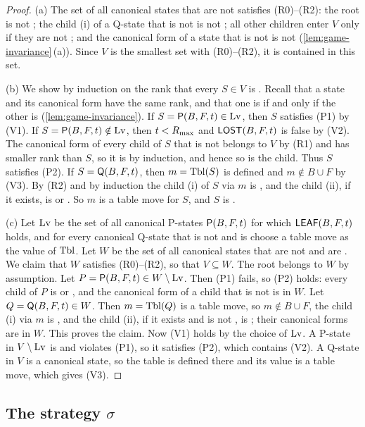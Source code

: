 \begin{proof}
(a) The set of all canonical states that are not \VOID{} satisfies (R0)--(R2): the root is not \VOID; the
child \textup{(i)} of a Q-state that is not \VOID{} is not \VOID; all other children enter $V$ only if they
are not \VOID; and the canonical form of a state that is not \VOID{} is not \VOID{}
(\cref{lem:game-invariance}\,(a)). Since $V$ is the smallest set with (R0)--(R2), it is contained in this
set.

(b) We show by induction on the rank that every $S\in V$ is \WON. Recall that a state and its canonical form
have the same rank, and that one is \WON{} if and only if the other is (\cref{lem:game-invariance}).
If $S=\mathsf{P}(B,F,t)\in\mathrm{Lv}$, then $S$ satisfies (P1) by (V1). If $S=\mathsf{P}(B,F,t)\notin\mathrm{Lv}$, then $t<R_{\max}$ and
$\mathsf{LOST}(B,F,t)$ is false by (V2). The canonical form of every child of $S$ that is not \VOID{} belongs to $V$
by (R1) and has smaller rank than $S$, so it is \WON{} by induction, and hence so is the child. Thus $S$
satisfies (P2). If $S=\mathsf{Q}(B,F,t)$, then $m=\mathrm{Tbl}(S)$ is defined and $m\notin B\cup F$ by (V3). By (R2) and by
induction the child \textup{(i)} of $S$ via $m$ is \WON, and the child \textup{(ii)}, if it exists, is \VOID{}
or \WON. So $m$ is a table move for $S$, and $S$ is \WON.

(c) Let $\mathrm{Lv}$ be the set of all canonical P-states $\mathsf{P}(B,F,t)$ for which $\mathsf{LEAF}(B,F,t)$ holds, and for every
canonical Q-state that is not \VOID{} and is \WON{} choose a table move as the value of $\mathrm{Tbl}$. Let $W$ be
the set of all canonical states that are not \VOID{} and are \WON. We claim that $W$ satisfies (R0)--(R2),
so that $V\subseteq W$. The root belongs to $W$ by assumption. Let $P=\mathsf{P}(B,F,t)\in W\setminus\mathrm{Lv}$. Then
(P1) fails, so (P2) holds: every child of $P$ is \WON{} or \VOID, and the canonical form of a child that is
not \VOID{} is in $W$. Let $Q=\mathsf{Q}(B,F,t)\in W$. Then $m=\mathrm{Tbl}(Q)$ is a table move, so $m\notin B\cup F$, the
child \textup{(i)} via $m$ is \WON, and the child \textup{(ii)}, if it exists and is not \VOID, is \WON; their
canonical forms are in $W$. This proves the claim. Now (V1) holds by the choice of $\mathrm{Lv}$. A P-state in
$V\setminus\mathrm{Lv}$ is \WON{} and violates (P1), so it satisfies (P2), which contains (V2). A Q-state in $V$ is a
canonical \WON{} state, so the table is defined there and its value is a table move, which gives (V3).
\end{proof}

\subsection{The strategy \texorpdfstring{$\sigma$}{sigma}}\label{sec:sigma}


